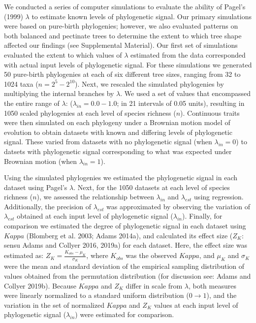 \documentclass[
]{article}
\begin{document}
We conducted a series of computer simulations to evaluate the ability of
Pagel's (1999) \(\lambda\) to estimate known levels of phylogenetic
signal. Our primary simulations were based on pure-birth phylogenies;
however, we also evaluated patterns on both balanced and pectinate trees
to determine the extent to which tree shape affected our findings (see
Supplemental Material). Our first set of simulations evaluated the
extent to which values of \(\lambda\) estimated from the data
corresponded with actual input levels of phylogenetic signal. For these
simulations we generated 50 pure-birth phylogenies at each of six
different tree sizes, ranging from 32 to 1024 taxa (\(n=2^5 - 2^{10}\)).
Next, we rescaled the simulated phylogenies by multiplying the internal
branches by \(\lambda\). We used a set of values that encompassed the
entire range of \(\lambda\): (\(\lambda_{in} = 0.0 - 1.0\); in 21
intervals of 0.05 units), resulting in 1050 scaled phylogenies at each
level of species richness (\(n\)). Continuous traits were then simulated
on each phylogeny under a Brownian motion model of evolution to obtain
datasets with known and differing levels of phylogenetic signal. These
varied from datasets with no phylogenetic signal (when
\(\lambda_{in} =0\)) to datsets with phylogenetic signal corresponding
to what was expected under Brownian motion (when \(\lambda_{in} =1\)).
\hfill\break

Using the simulated phylogenies we estimated the phylogenetic signal in
each dataset using Pagel's \(\lambda\). Next, for the 1050 datasets at
each level of species richness (\(n\)), we assessed the relationship
between \(\lambda_{in}\) and \(\lambda_{est}\) using regression.
Additionally, the precision of \(\lambda_{est}\) was approximated by
observing the variation of \(\lambda_{est}\) obtained at each input
level of phylogenetic signal (\(\lambda_{in}\)). Finally, for comparison
we estimated the degree of phylogenetic signal in each dataset using
\(Kappa\) (Blomberg et al. 2003; Adams 2014a), and calculated its effect
size (\(Z_K\): sensu Adams and Collyer 2016, 2019a) for each dataset.
Here, the effect size was estimated as:
\(Z_K=\frac{K_{obs}-\mu_K}{\sigma_K}\), where \(K_{obs}\) was the
observed \(Kappa\), and \(\mu_K\) and \(\sigma_K\) were the mean and
standard deviation of the empirical sampling distribution of values
obtained from the permutation distribution (for discussion see: Adams
and Collyer 2019b). Because \(Kappa\) and \(Z_K\) differ in scale from
\(\lambda\), both measures were linearly normalized to a standard
uniform distribution (\(0\rightarrow1\)), and the variation in the set
of normalized \(Kappa\) and \(Z_K\) values at each input level of
phylogenetic signal (\(\lambda_{in}\)) were estimated for comparison.
\hfill\break
\end{document}
